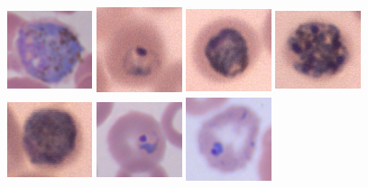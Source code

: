 \begin{figure}[H]
	\includegraphics[width=2.5cm, height=2.5cm]{images/malaria/ovale_4_gametocyte}
	\includegraphics[width=2.5cm, height=2.5cm]{images/malaria/malariae_1_ring}
	\includegraphics[width=2.5cm, height=2.5cm]{images/malaria/malariae_2_trophozoite}
	\includegraphics[width=2.5cm, height=2.5cm]{images/malaria/malariae_3_schizont}
	\includegraphics[width=2.5cm, height=2.5cm]{images/malaria/malariae_4_gametocyte}
	\includegraphics[width=2.5cm, height=2.5cm]{images/malaria/vivax_1_ring}
	\includegraphics[width=2.5cm, height=2.5cm]{images/malaria/vivax_2c_trophozoiteDeveloped}

\end{figure}
